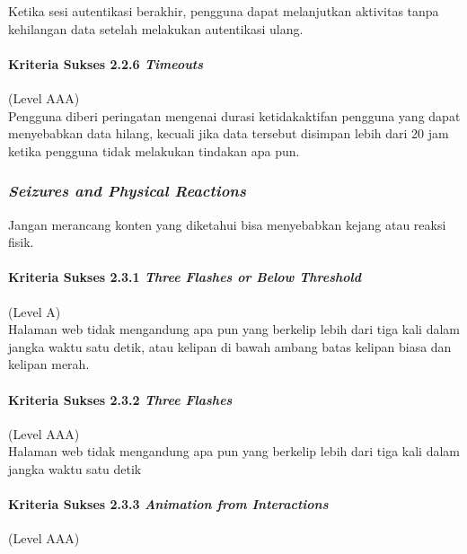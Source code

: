 Ketika sesi autentikasi berakhir, pengguna dapat melanjutkan aktivitas tanpa kehilangan data setelah melakukan autentikasi ulang.

\paragraph{Kriteria Sukses 2.2.6 \textit{Timeouts}}
\label{sec:kriteria_sukses_2.2.6}
(Level AAA)\\

Pengguna diberi peringatan mengenai durasi ketidakaktifan pengguna yang dapat menyebabkan data hilang, kecuali jika data tersebut disimpan lebih dari 20 jam ketika pengguna tidak melakukan tindakan apa pun.

\subsubsection{\textit{Seizures and Physical Reactions}}
\label{sec:seizures_and_physical_reactions}
Jangan merancang konten yang diketahui bisa menyebabkan kejang atau reaksi fisik.

\paragraph{Kriteria Sukses 2.3.1 \textit{Three Flashes or Below Threshold}}
\label{sec:kriteria_sukses_2.3.1}
(Level A)\\

Halaman web tidak mengandung apa pun yang berkelip lebih dari tiga kali dalam jangka waktu satu detik, atau kelipan di bawah ambang batas kelipan biasa dan kelipan merah.

\paragraph{Kriteria Sukses 2.3.2 \textit{Three Flashes}}
\label{sec:kriteria_sukses_2.3.2}
(Level AAA)\\

Halaman web tidak mengandung apa pun yang berkelip lebih dari tiga kali dalam jangka waktu satu detik

\paragraph{Kriteria Sukses 2.3.3 \textit{Animation from Interactions}}
\label{sec:kriteria_sukses_2.3.3}
(Level AAA)\\

